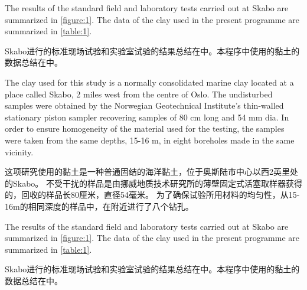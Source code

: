\begin{paracol}{2}

    The results of the standard field and laboratory tests carried out at Skabo are summarized in \autoref{figure:1}. The data of the clay used in the present programme are summarized in \autoref{table:1}.

    \switchcolumn
        
    Skabo进行的标准现场试验和实验室试验的结果总结在中。本程序中使用的黏土的数据总结在中。

    \switchcolumn*

    The clay used for this study is a normally consolidated marine clay located at a place called Skabo, 2 miles west from the centre of Oslo. The undisturbed samples were obtained by the Norwegian Geotechnical Institute's thin-walled stationary piston sampler recovering samples of 80 cm long and 54 mm dia. In order to ensure homogeneity of the material used for the testing, the samples were taken from the same depths, 15-16 m, in eight boreholes made in the same vicinity.

    \switchcolumn      
    
    这项研究使用的黏土是一种普通固结的海洋黏土，位于奥斯陆市中心以西2英里处的Skabo。 不受干扰的样品是由挪威地质技术研究所的薄壁固定式活塞取样器获得的，回收的样品长80厘米，直径54毫米。 为了确保试验所用材料的均匀性，从15-16m的相同深度的样品中，在附近进行了八个钻孔。

    \switchcolumn*      
    
    The results of the standard field and laboratory tests carried out at Skabo are summarized in \autoref{figure:1}. The data of the clay used in the present programme are summarized in \autoref{table:1}.

    \switchcolumn              
    
    Skabo进行的标准现场试验和实验室试验的结果总结在中。本程序中使用的黏土的数据总结在中。
    \switchcolumn*
    
\end{paracol}



